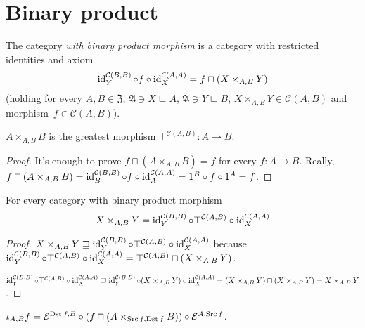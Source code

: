 \section{Binary product}

\begin{defn}
The category \emph{with binary product morphism}
is a category with restricted identities and axiom
\[\operatorname{id}^{\mathcal{C}(B,B)}_Y\circ f\circ\operatorname{id}^{\mathcal{C}(A,A)}_X=f\sqcap(X\times_{A,B}Y)\]
(holding for every $A,B\in\mathfrak{Z}$,
$\mathfrak{A}\ni X\sqsubseteq A$,
$\mathfrak{A}\ni Y\sqsubseteq B$,
$X\times_{A,B}Y\in\mathcal{C}(A,B)$
and morphism~$f\in\mathcal{C}(A,B)$).
\end{defn}

\begin{prop}
$A\times_{A,B}B$ is the greatest morphism
$\top^{\mathcal{C}(A,B)}:A\to B$.
\end{prop}

\begin{proof}
It's enough to prove $f\sqcap(A\times_{A,B}B)=f$ for every
$f:A\to B$. Really,
$f\sqcap(A\times_{A,B}B)=
\operatorname{id}^{\mathcal{C}(B,B)}_B\circ f\circ\operatorname{id}^{\mathcal{C}(A,A)}_A=
1^B\circ f\circ 1^A=f$.
\end{proof}

\begin{prop}
For every category with binary product morphism
\[X\times_{A,B}Y=
\operatorname{id}^{\mathcal{C}(B,B)}_Y\circ\top^{\mathcal{C}(A,B)}\circ
\operatorname{id}^{\mathcal{C}(A,A)}_X\]
\end{prop}

\begin{proof}
$X\times_{A,B}Y\sqsupseteq
\operatorname{id}^{\mathcal{C}(B,B)}_Y\circ\top^{\mathcal{C}(A,B)}\circ\operatorname{id}^{\mathcal{C}(A,A)}_X$
because
$\operatorname{id}^{\mathcal{C}(B,B)}_Y\circ\top^{\mathcal{C}(A,B)}\circ\operatorname{id}^{\mathcal{C}(A,A)}_X=
\top^{\mathcal{C}(A,B)}\sqcap(X\times_{A,B}Y)$.

$\operatorname{id}^{\mathcal{C}(B,B)}_Y\circ\top^{\mathcal{C}(A,B)}\circ\operatorname{id}^{\mathcal{C}(A,A)}_X\sqsupseteq
\operatorname{id}^{\mathcal{C}(B,B)}_Y\circ(X\times_{A,B}Y)\circ
\operatorname{id}^{\mathcal{C}(A,A)}_X=
(X\times_{A,B}Y)\sqcap(X\times_{A,B}Y)=X\times_{A,B}Y$.
\end{proof}

\begin{prop}
$\iota_{A,B}f=
\mathcal{E}^{\operatorname{Dst} f,B}\circ
(f\sqcap(A\times_{\operatorname{Src} f,\operatorname{Dst} f}B))\circ
\mathcal{E}^{A,\operatorname{Src} f}$.
\end{prop}

